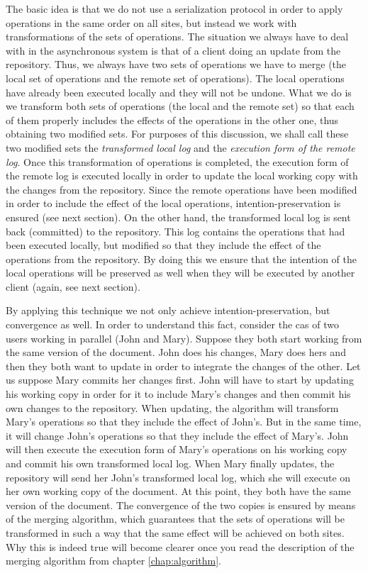 The basic idea is that we do not use a serialization protocol in order to apply
operations in the same order on all sites, but instead we work with transformations
of the sets of operations. The situation we always have to deal with in the asynchronous
system is that of a client doing an update from the repository. Thus, we always have
two sets of operations we have to merge (the local set of operations and the remote
set of operations). The local operations have already been executed locally and
they will not be undone. What we do is we transform both sets of operations (the
local and the remote set) so that each of them properly includes the effects of the
operations in the other one, thus obtaining two modified sets. For purposes of this
discussion, we shall call these two modified sets the \emph{transformed local log}
and the \emph{execution form of the remote log}. Once this transformation of
operations is completed, the execution form of the remote log is executed locally
in order to update the local working copy with the changes from the repository.
Since the remote operations have been modified in order to include the effect of
the local operations, intention-preservation is ensured (see next section). On the
other hand, the transformed local log is sent back (committed) to the repository.
This log contains the operations that had been executed locally, but modified so
that they include the effect of the operations from the repository. By doing this
we ensure that the intention of the local operations will be preserved as well
when they will be executed by another client (again, see next section).

By applying this technique we not only achieve intention-preservation, but
convergence as well. In order to understand this fact, consider the cas of two users working in
parallel (John and Mary). Suppose they both start working from the same version
of the document. John does his changes, Mary does hers and then they both want
to update in order to integrate the changes of the other. Let us suppose Mary
commits her changes first. John will have to start by updating his working copy
in order for it to include Mary's changes and then commit his own changes
to the repository. When updating, the algorithm will transform Mary's operations
so that they include the effect of John's. But in the same time, it will change
John's operations so that they include the effect of Mary's. John will then
execute the execution form of Mary's operations on his working copy and commit
his own transformed local log. When Mary finally updates, the repository will
send her John's transformed local log, which she will execute on her own 
working copy of the document. At this point, they both have the same version
of the document. The convergence of the two copies is ensured by means of the
merging algorithm, which guarantees that the sets of operations will be transformed
in such a way that the same effect will be achieved on both sites. Why
this is indeed true will become clearer once you read the description of the
merging algorithm from chapter \ref{chap:algorithm}.

